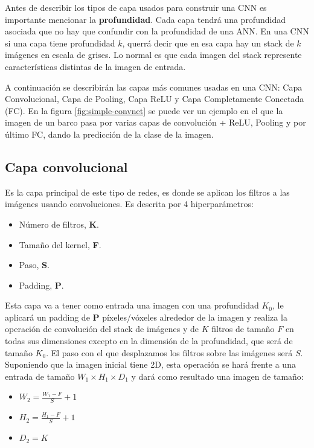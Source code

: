 Antes de describir los tipos de capa usados para construir una  CNN es importante mencionar la \textbf{profundidad}. Cada capa tendrá una profundidad asociada que no hay que confundir con la profundidad de una ANN. En una CNN si una capa tiene profundidad $k$, querrá decir que en esa capa hay un stack de $k$ imágenes en escala de grises. Lo normal es que cada imagen del stack represente características distintas de la imagen de entrada.

A continuación se describirán las capas más comunes usadas en una CNN: Capa Convolucional, Capa de Pooling, Capa ReLU y Capa Completamente Conectada (FC). En la figura \ref{fig:simple-convnet} \cite{missinglink2020} se puede ver un ejemplo en el que la imagen de un barco pasa por varias capas de convolución + ReLU, Pooling y por último FC, dando la predicción de la clase de la imagen.


\newpage\subsection{Capa convolucional}\label{cnn_capa_conv}

Es la capa principal de este tipo de redes, es donde se aplican los filtros a las imágenes usando convoluciones. Es descrita por 4 hiperparámetros:

\begin{itemize}
\item Número de filtros, \textbf{K}.
\item Tamaño del kernel, \textbf{F}.
\item Paso, \textbf{S}.
\item Padding, \textbf{P}.
\end{itemize}

Esta capa va a tener como entrada una imagen con una profundidad $K_0$, le aplicará un padding de \textbf{P} píxeles/vóxeles alrededor de la imagen y realiza la operación de convolución del stack de imágenes y de $K$ filtros de tamaño $F$ en todas sus dimensiones excepto en la dimensión de la profundidad, que será de tamaño $K_0$. El paso con el que desplazamos los filtros sobre las imágenes será $S$. Suponiendo que la imagen inicial tiene 2D, esta operación se hará frente a una entrada de tamaño $W_1 \times H_1 \times D_1$ y dará como resultado una imagen de tamaño:

\begin{itemize}
\item $W_2 = \frac{W_1 - F}{S} + 1$
\item $H_2 = \frac{H_1 - F}{S} + 1$
\item $D_2 = K$
\end{itemize}

